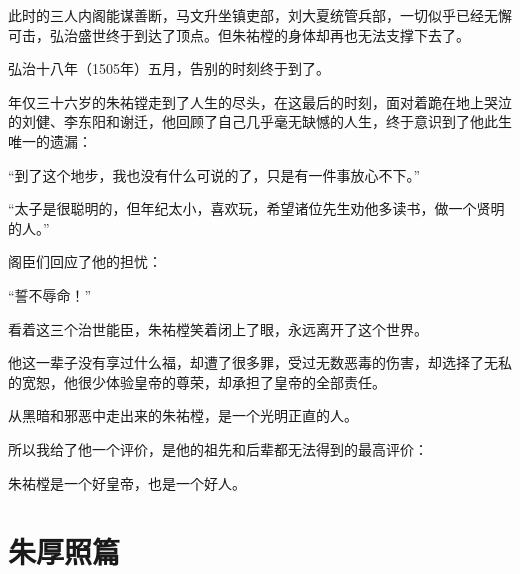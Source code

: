 \begin{multicols}{\theparacolNo}
此时的三人内阁能谋善断，马文升坐镇吏部，刘大夏统管兵部，一切似乎已经无懈可击，弘治盛世终于到达了顶点。但朱祐樘的身体却再也无法支撑下去了。

弘治十八年（1505年）五月，告别的时刻终于到了。

年仅三十六岁的朱祐镗走到了人生的尽头，在这最后的时刻，面对着跪在地上哭泣的刘健、李东阳和谢迁，他回顾了自己几乎毫无缺憾的人生，终于意识到了他此生唯一的遗漏：

“到了这个地步，我也没有什么可说的了，只是有一件事放心不下。”

“太子是很聪明的，但年纪太小，喜欢玩，希望诸位先生劝他多读书，做一个贤明的人。”

阁臣们回应了他的担忧：

“誓不辱命！”

看着这三个治世能臣，朱祐樘笑着闭上了眼，永远离开了这个世界。

他这一辈子没有享过什么福，却遭了很多罪，受过无数恶毒的伤害，却选择了无私的宽恕，他很少体验皇帝的尊荣，却承担了皇帝的全部责任。

从黑暗和邪恶中走出来的朱祐樘，是一个光明正直的人。

所以我给了他一个评价，是他的祖先和后辈都无法得到的最高评价：

朱祐樘是一个好皇帝，也是一个好人。
\ifnum{}
	\end{multicols}
\fi
\newpage
\chapter*{朱厚照篇}
